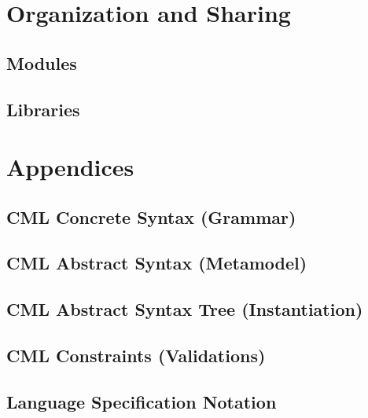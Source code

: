 \documentclass[a4paper,oneside,12pt, extrafontsizes]{memoir}
\begin{document}
\part{Organization and Sharing}

  \chapter{Modules}
  \label{ch:modules}

  \chapter{Libraries}
  \label{ch:libraries}

\part{Appendices}

\appendix

  \chapter{CML Concrete Syntax (Grammar)}
  \label{apx:concrete-syntax}
  

  \chapter{CML Abstract Syntax (Metamodel)}
  \label{apx:abstract-syntax}
  

  \chapter{CML Abstract Syntax Tree (Instantiation)}
  \label{apx:ast}
  

  \chapter{CML Constraints (Validations)}
  \label{apx:ocl}
  

  \chapter{Language Specification Notation}
  \label{apx:lsl}
  

\backmatter



\end{document}
